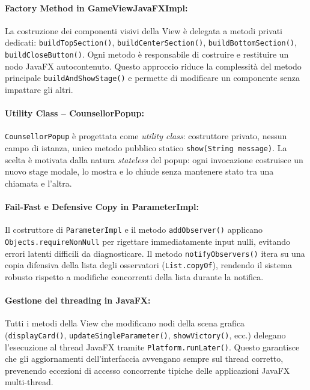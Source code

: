 \documentclass[11pt, a4paper, oneside]{report}
\begin{document}
\bigskip
\paragraph{Factory Method in GameViewJavaFXImpl:}
\smallskip
La costruzione dei componenti visivi della View è delegata a
metodi privati dedicati: \texttt{buildTopSection()},
\texttt{buildCenterSection()}, \texttt{buildBottomSection()},
\texttt{buildCloseButton()}. Ogni metodo è responsabile di
costruire e restituire un nodo JavaFX autocontenuto. Questo
approccio riduce la complessità del metodo principale
\texttt{buildAndShowStage()} e permette di modificare un
componente senza impattare gli altri.

\bigskip
\paragraph{Utility Class -- CounsellorPopup:}
\smallskip
\texttt{CounsellorPopup} è progettata come \emph{utility class}:
costruttore privato, nessun campo di istanza, unico metodo
pubblico statico \texttt{show(String message)}. La scelta è
motivata dalla natura \emph{stateless} del popup: ogni
invocazione costruisce un nuovo stage modale, lo mostra e
lo chiude senza mantenere stato tra una chiamata e l'altra.

\bigskip
\paragraph{Fail-Fast e Defensive Copy in ParameterImpl:}
\smallskip
Il costruttore di \texttt{ParameterImpl} e il metodo
\texttt{addObserver()} applicano \texttt{Objects.requireNonNull}
per rigettare immediatamente input nulli, evitando errori
latenti difficili da diagnosticare. Il metodo
\texttt{notifyObservers()} itera su una copia difensiva
della lista degli osservatori (\texttt{List.copyOf}), rendendo
il sistema robusto rispetto a modifiche concorrenti della lista
durante la notifica.

\bigskip
\paragraph{Gestione del threading in JavaFX:}
\smallskip
Tutti i metodi della View che modificano nodi della scena
grafica (\texttt{displayCard()}, \texttt{updateSingleParameter()},
\texttt{showVictory()}, ecc.) delegano l'esecuzione al thread
JavaFX tramite \texttt{Platform.runLater()}. Questo garantisce
che gli aggiornamenti dell'interfaccia avvengano sempre sul
thread corretto, prevenendo eccezioni di accesso concorrente
tipiche delle applicazioni JavaFX multi-thread.
\end{document}
